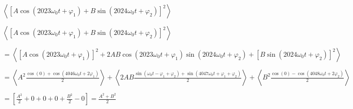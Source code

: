 

		
		
	


	


\begin{enonce}
$\left<\left[A\cos(2023\omega_0 t + \varphi_1) + B\sin(2024\omega_0 t + \varphi_2)\right]^2\right>$
\end{enonce}
		
		
\begin{corrige}
	$\left<\left[A\cos(2023\omega_0 t + \varphi_1) + B\sin(2024\omega_0 t + \varphi_2)\right]^2\right>$
	
	$=\left<\left[A\cos(2023\omega_0 t + \varphi_1)\right]^2 + 2 AB \cos(2023\omega_0 t + \varphi_1) \sin(2024\omega_0 t + \varphi_2) + \left[B\sin(2024\omega_0 t + \varphi_2)\right]^2 \right>$

	$=\left<A^2 \frac{\cos(0)+\cos(4046\omega_0 t + 2\varphi_1)}{2}\right> + \left<2 AB \frac{\sin(\omega_0 t-\varphi_1+\varphi_2)+\sin(4047\omega_0 t + \varphi_1+ \varphi_2)}{2}\right> + \left<B^2 \frac{\cos(0)-\cos(4048\omega_0 t + 2\varphi_2)}{2}\right>$

	$=\left[\frac{A^2}{2}+0+0+0+\frac{B^2}{2}-0 \right]=\frac{A^2+B^2}{2}$
\end{corrige}
	
